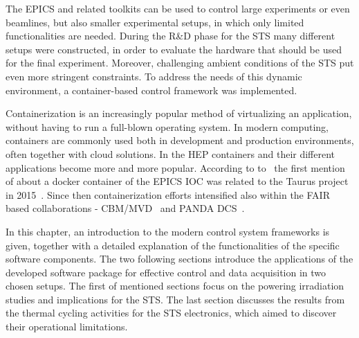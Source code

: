 
The \gls{EPICS} and related toolkits can be used to control large experiments or even beamlines, but also smaller experimental setups, in which only limited functionalities are needed. During the R\&D phase for the \gls{STS} many different setups were constructed, in order to evaluate the hardware that should be used for the final experiment. Moreover, challenging ambient conditions of the \gls{STS} put even more stringent constraints. To address the needs of this dynamic environment, a container-based control framework was implemented. 

Containerization is an increasingly popular method of virtualizing an application, without having to run a full-blown operating system. In modern computing, containers are commonly used both in development and production environments, often together with cloud solutions. In the \gls{HEP} containers and their different applications become more and more popular. According to to~\cite{Klaus2021} the first mention of about a docker container of the \gls{EPICS} \gls{IOC} was related to the Taurus project in 2015~\cite{taurus}. Since then containerization efforts intensified also within the \gls{FAIR} based collaborations - \gls{CBM}/\gls{MVD}~\cite{Klaus2021} and PANDA DCS~\cite{PANDA_1}.

In this chapter, an introduction to the modern control system frameworks is given, together with a detailed explanation of the functionalities of the specific software components. The two following sections introduce the applications of the developed software package for effective control and data acquisition in two chosen setups. The first of mentioned sections focus on the powering irradiation studies and implications for the \gls{STS}. The last section discusses the results from the thermal cycling activities for the \gls{STS} electronics, which aimed to discover their operational limitations.
  
